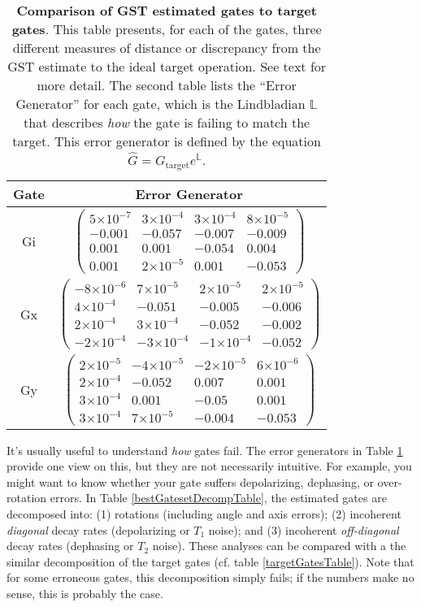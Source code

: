\documentclass{article}[11pt]
\providecommand{\e}[1]{\ensuremath{\times 10^{#1}}}
\begin{document}
\begin{table}[h]
\begin{center}
\vspace{2em}
\begin{tabular}[l]{|c|c|}
\hline
Gate & Error Generator \\ \hline
Gi & $ \left(\!\!\begin{array}{cccc}
5\e{-7} & 3\e{-4} & 3\e{-4} & 8\e{-5} \\ 
-0.001 & -0.057 & -0.007 & -0.009 \\ 
0.001 & 0.001 & -0.054 & 0.004 \\ 
0.001 & 2\e{-5} & 0.001 & -0.053
 \end{array}\!\!\right) $
 \\ \hline
Gx & $ \left(\!\!\begin{array}{cccc}
-8\e{-6} & 7\e{-5} & 2\e{-5} & 2\e{-5} \\ 
4\e{-4} & -0.051 & -0.005 & -0.006 \\ 
2\e{-4} & 3\e{-4} & -0.052 & -0.002 \\ 
-2\e{-4} & -3\e{-4} & -1\e{-4} & -0.052
 \end{array}\!\!\right) $
 \\ \hline
Gy & $ \left(\!\!\begin{array}{cccc}
2\e{-5} & -4\e{-5} & -2\e{-5} & 6\e{-6} \\ 
2\e{-4} & -0.052 & 0.007 & 0.001 \\ 
3\e{-4} & 0.001 & -0.05 & 0.001 \\ 
3\e{-4} & 7\e{-5} & -0.004 & -0.053
 \end{array}\!\!\right) $
 \\ \hline
\end{tabular}

\caption{\textbf{Comparison of GST estimated gates to target gates}.  This table presents, for each of the gates, three different measures of distance or discrepancy from the GST estimate to the ideal target operation.  See text for more detail.  The second table lists the ``Error Generator'' for each gate, which is the Lindbladian $\mathbb{L}$ that describes \emph{how} the gate is failing to match the target.  This error generator is defined by the equation $\hat{G} = G_{\mathrm{target}}e^{\mathbb{L}}$. \label{bestGatesetVsTargetTable}}
\end{center}
\end{table}

It's usually useful to understand \emph{how} gates fail.  The error generators in Table \ref{bestGatesetVsTargetTable} provide one view on this, but they are not necessarily intuitive.   For example, you might want to know whether your gate suffers depolarizing, dephasing, or over-rotation errors.  In Table \ref{bestGatesetDecompTable}, the estimated gates are decomposed into: (1) rotations (including angle and axis errors); (2) incoherent \emph{diagonal} decay rates (depolarizing or $T_1$ noise); and (3) incoherent \emph{off-diagonal} decay rates (dephasing or $T_2$ noise).  These analyses can be compared with a the similar decomposition of the target gates (cf. table \ref{targetGatesTable}).  Note that for some erroneous gates, this decomposition simply fails; if the numbers make no sense, this is probably the case.
\end{document}
